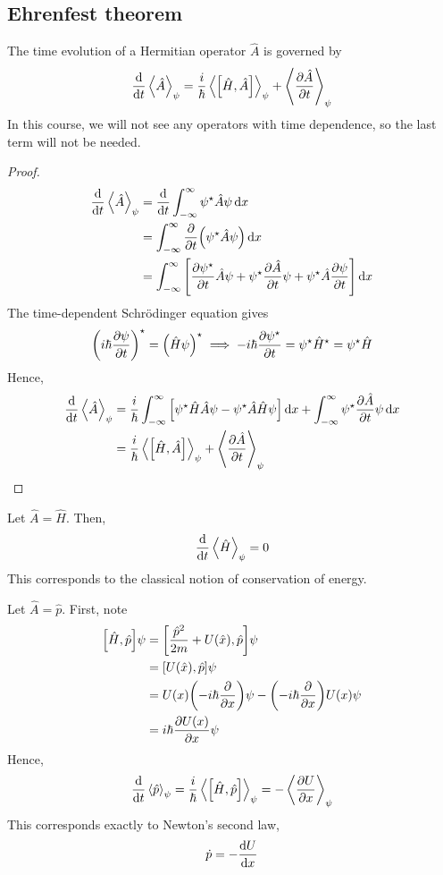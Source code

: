 \subsection{Ehrenfest theorem}
\begin{theorem}
	The time evolution of a Hermitian operator \( \hat A \) is governed by
	\[
		\dv{t} \left\langle{\hat A}\right\rangle_\psi = \frac{i}{\hbar} \left\langle{\qty[\hat H, \hat A]}\right\rangle_\psi + \left\langle{\pdv{\hat A}{t}}\right\rangle_\psi
	\]
	In this course, we will not see any operators with time dependence, so the last term will not be needed.
\end{theorem}
\begin{proof}
	\begin{align*}
		\dv{t} \left\langle{\hat A}\right\rangle_\psi & = \dv{t} \int_{-\infty}^\infty \psi^\star \hat A \psi \dd{x}                                                                              \\
		                           & = \int_{-\infty}^\infty \pdv{t} \qty(\psi^\star \hat A \psi) \dd{x}                                                                       \\
		                           & = \int_{-\infty}^\infty \qty[\pdv{\psi^\star}{t} \hat A \psi + \psi^\star \pdv{\hat A}{t} \psi + \psi^\star \hat A \pdv{\psi}{t} ] \dd{x}
	\end{align*}
	The time-dependent Schr\"odinger equation gives
	\[
		\qty(i \hbar \pdv{\psi}{t})^\star = \qty(\hat H \psi)^\star \implies -i\hbar \pdv{\psi^\star}{t} = \psi^\star \hat H^\star = \psi^\star \hat H
	\]
	Hence,
	\begin{align*}
		\dv{t} \left\langle{\hat A}\right\rangle_\psi & = \frac{i}{\hbar} \int_{-\infty}^\infty \qty[\psi^\star \hat H \hat A \psi - \psi^\star \hat A \hat H \psi] \dd{x} + \int_{-\infty}^\infty \psi^\star \pdv{\hat A}{t} \psi \dd{x} \\
		                           & = \frac{i}{\hbar} \left\langle{\qty[\hat H, \hat A]}\right\rangle_\psi + \left\langle{\pdv{\hat A}{t}}\right\rangle_\psi
	\end{align*}
\end{proof}
\begin{example}
	Let \( \hat A = \hat H \).
	Then,
	\[
		\dv{t} \left\langle{\hat H}\right\rangle_\psi = 0
	\]
	This corresponds to the classical notion of conservation of energy.
\end{example}
\begin{example}
	Let \( \hat A = \hat p \).
	First, note
	\begin{align*}
		\qty[\hat H, \hat p] \psi & = \qty[\frac{\hat p^2}{2m} + U(\hat x), \hat p] \psi               \\
		                          & = \qty[U(\hat x), \hat p] \psi                                     \\
		                          & = U(x) \qty(-i\hbar \pdv{x}) \psi - \qty(-i\hbar \pdv{x})U(x) \psi \\
		                          & = i \hbar \pdv{U(x)}{x} \psi
	\end{align*}
	Hence,
	\[
		\dv{t}\left\langle{\hat p}\right\rangle_\psi = \frac{i}{\hbar} \left\langle{\qty[\hat H, \hat p]}\right\rangle_\psi = -\left\langle{\pdv{U}{x}}\right\rangle_\psi
	\]
	This corresponds exactly to Newton's second law,
	\[
		\dot p = -\dv{U}{x}
	\]
\end{example}
